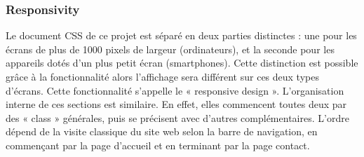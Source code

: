 \documentclass[a4,10pt,french]{sphinxmanual}
\begin{document}
\subsubsection{Responsivity}
\label{\detokenize{chapitre-02:responsivity}}
\sphinxAtStartPar
Le document CSS de ce projet est séparé en deux parties distinctes : une pour les écrans de plus de 1000 pixels de largeur (ordinateurs), et la seconde pour les appareils dotés d’un plus petit écran (smartphones). Cette distinction est possible grâce à la fonctionnalité  alors l’affichage sera différent sur ces deux types d’écrans. Cette fonctionnalité s’appelle le « responsive design ». L’organisation interne de ces sections est similaire. En effet, elles commencent toutes deux par des « class » générales, puis se précisent avec d’autres  complémentaires. L’ordre dépend de la visite classique du site web selon la barre de navigation, en commençant par la page d’accueil et en terminant par la page contact.
\end{document}
